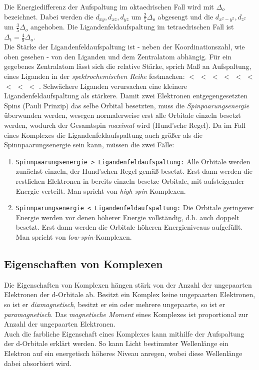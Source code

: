 \documentclass{scrartcl}
\begin{document}
Die Energiedifferenz der Aufspaltung im oktaedrischen Fall wird mit $\Delta_o$ bezeichnet. Dabei werden die $d_{xy}, d_{xz}, d_{yz}$ um $\frac{2}{5}\Delta_o$ abgesengt und die $d_{x^2-y^2}, d_{z^2}$ um $\frac{3}{5}\Delta_o$ angehoben. Die Ligandenfeldaufspaltung im tetraedrischen Fall ist $\Delta_t = \frac{4}{9}\Delta_o$. \\
Die Stärke der Ligandenfeldaufspaltung ist - neben der Koordinationszahl, wie oben gesehen - von den Liganden und dem Zentralatom abhängig. Für ein gegebenes Zentralatom lässt sich die relative Stärke, sprich Maß an Aufspaltung, eines Liganden in der \emph{spektrochemischen Reihe} festmachen:  $<$  $<$  $<$  $<$  $<$  $<$  $<$  $<$  $<$ . Schwächere Liganden verursachen eine kleinere Ligandenfeldaufspaltung als stärkere. Damit zwei Elektronen entgegengesetzten Spins (Pauli Prinzip) das selbe Orbital besetzten, muss die \emph{Spinpaarungsenergie} überwunden werden, wesegen normalerweise erst alle Orbitale einzeln besetzt werden, wodurch der Gesamtspin \emph{maximal} wird (Hund'sche Regel). Da im Fall eines Komplexes die Ligandenfeldaufspaltung auch größer als die Spinnpaarungsenergie sein kann, müssen die zwei Fälle: 
\begin{enumerate}
	\item \texttt{Spinnpaarungsenergie > Ligandenfeldaufspaltung:} Alle Orbitale werden zunächst einzeln, der Hund'schen Regel gemäß besetzt. Erst dann werden die restlichen Elektronen in bereits einzeln besetze Orbitale, mit aufsteigender Energie verteilt. Man spricht von \emph{high-spin}-Komplexen.
	\item \texttt{Spinnparungsenergie < Ligandenfeldaufspaltung:} Die Orbitale geringerer Energie werden vor denen höherer Energie vollständig, d.h. auch doppelt besetzt. Erst dann werden die Orbitale höheren Energieniveaus aufgefüllt. Man spricht von \emph{low-spin}-Komplexen. 
\end{enumerate}
\subsection{Eigenschaften von Komplexen}
Die Eigenschaften von Komplexen hängen stärk von der Anzahl der ungepaarten Elektronen der d-Orbitale ab. Besitzt ein Komplex keine ungepaarten Elektronen, so ist er \emph{diamagnetisch}, besitzt er ein oder mehrere ungepaarte, so ist er \emph{paramagnetisch}. Das \emph{magnetische Moment} eines Komplexes ist proportional zur Anzahl der ungepaarten Elektronen. \\
Auch die farbliche Eigenschaft eines Komplexes kann mithilfe der Aufspaltung der d-Orbitale erklärt werden. So kann Licht bestimmter Wellenlänge ein Elektron auf ein energetisch höheres Niveau anregen, wobei diese Wellenlänge dabei absorbiert wird. 
\end{document}
